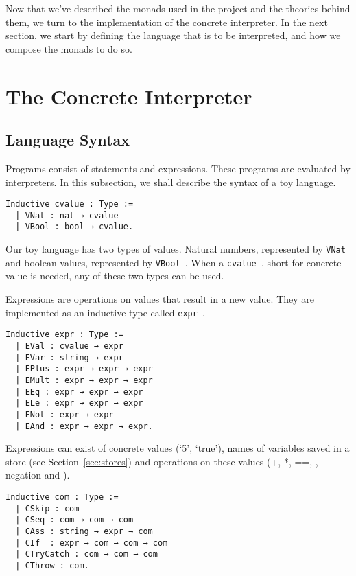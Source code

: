 Now that we've described the monads used in the project and the 
theories behind them, we turn to the implementation of the concrete
interpreter. In the next section, we start by defining the language that is to
be interpreted, and how we compose the monads to do so.

\section{The Concrete Interpreter}\label{sec:concrete}

\subsection{Language Syntax}
\label{sec:lang}
Programs consist of statements and expressions. These programs are evaluated by
interpreters. In this subsection, we shall describe the syntax of a toy
language.

\begin{listing}
\begin{verbatim}
Inductive cvalue : Type :=
  | VNat : nat → cvalue
  | VBool : bool → cvalue.
\end{verbatim}
\end{listing}

Our toy language has two types of values. Natural numbers, represented by
\texttt{VNat } and boolean values, represented by \texttt{VBool }. 
When a \texttt{cvalue }, short for concrete value is needed, any of
these two types can be used.

Expressions are operations on values that result in a new value. They are
implemented as an inductive type called \texttt{expr }. 

\begin{listing}
\begin{verbatim}
Inductive expr : Type :=
  | EVal : cvalue → expr
  | EVar : string → expr
  | EPlus : expr → expr → expr
  | EMult : expr → expr → expr
  | EEq : expr → expr → expr
  | ELe : expr → expr → expr
  | ENot : expr → expr
  | EAnd : expr → expr → expr.
\end{verbatim}
\end{listing}

Expressions can exist of concrete values (`5', `true'), names of variables
saved in a store (see Section~\ref{sec:stores}) and operations on these values
(+, *, ==, \coq{<= }, negation and \coq{&& }). 

\begin{listing}
\begin{verbatim}
Inductive com : Type :=
  | CSkip : com
  | CSeq : com → com → com
  | CAss : string → expr → com
  | CIf  : expr → com → com → com
  | CTryCatch : com → com → com
  | CThrow : com. 
\end{verbatim}
\end{listing}

